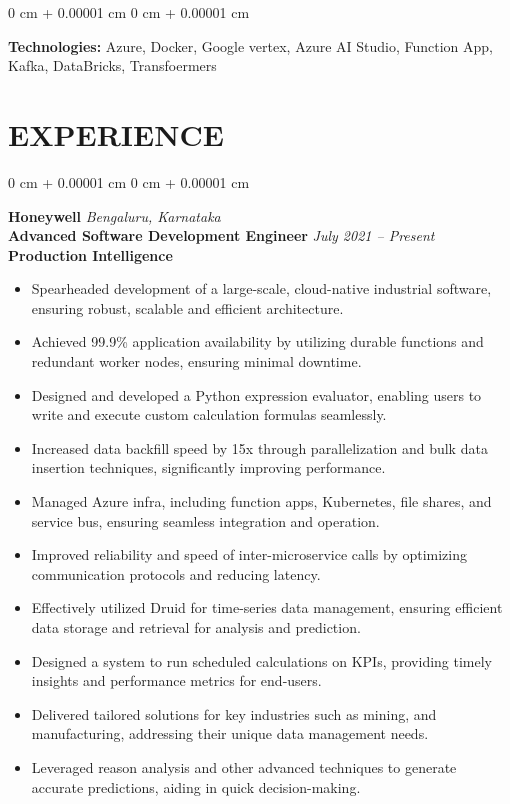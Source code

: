 \documentclass[10pt, letterpaper]{article}
\newenvironment{highlights}{
    \begin{itemize}[
        topsep=0.03 cm,
        parsep=0.02 cm,
        partopsep=0pt,
        itemsep=0pt,
        leftmargin=0 cm + 5pt
    ]
}{
    \end{itemize}
} %
\newenvironment{onecolentry}{
    \begin{adjustwidth}{
        0 cm + 0.00001 cm
    }{
        0 cm + 0.00001 cm
    }
}{
    \end{adjustwidth}
} %
\begin{document}
        \vspace{0.03 cm}

        \begin{onecolentry}
            \textbf{Technologies:} Azure, Docker, Google vertex, Azure AI Studio, Function App, Kafka, DataBricks, Transfoermers\end{onecolentry}

        

    \section{EXPERIENCE}

    
        \begin{onecolentry}
            \textbf{\large Honeywell} \hfill \textit{\textcolor{darkteal}{Bengaluru, Karnataka}} \\  
            \textbf{\normalsize Advanced Software Development Engineer} \hfill \textit{\textcolor{darkteal}{July 2021 – Present}} \\ %
            \textbf{Production Intelligence} \\  
            \begin{adjustwidth}{0.4cm}{0cm}
                \begin{highlights}
                    \item Spearheaded development of a large-scale, cloud-native industrial software, ensuring robust, scalable and efficient architecture.
                    \item Achieved 99.9\% application availability by utilizing durable functions and redundant worker nodes, ensuring minimal downtime.
                    \item Designed and developed a Python expression evaluator, enabling users to write and execute custom calculation formulas seamlessly.
                    \item Increased data backfill speed by 15x through parallelization and bulk data insertion techniques, significantly improving performance.
                    \item Managed Azure infra, including function apps, Kubernetes, file shares, and service bus, ensuring seamless integration and operation.
                    \item Improved reliability and speed of inter-microservice calls by optimizing communication protocols and reducing latency.
                    \item Effectively utilized Druid for time-series data management, ensuring efficient data storage and retrieval for analysis and prediction.
                    \item Designed a system to run scheduled calculations on KPIs, providing timely insights and performance metrics for end-users.
                    \item Delivered tailored solutions for key industries such as mining, and manufacturing, addressing their unique data management needs.
                    \item Leveraged reason analysis and other advanced techniques to generate accurate predictions, aiding in quick decision-making.
                    

\end{highlights}
\end{adjustwidth}
\end{onecolentry}
\end{document}
